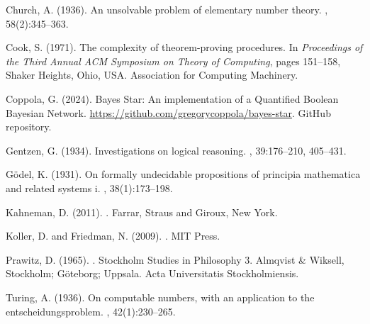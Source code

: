 \documentclass[11pt]{article}
\begin{document}
\begin{thebibliography}{9}

    Church, A. (1936).
    \newblock An unsolvable problem of elementary number theory.
    , 58(2):345--363.
    
    Cook, S. (1971).
    \newblock The complexity of theorem-proving procedures.
    \newblock In {\em Proceedings of the Third Annual ACM Symposium on Theory of
      Computing}, pages 151--158, Shaker Heights, Ohio, USA. Association for
      Computing Machinery.
    
    Coppola, G. (2024).
    \newblock Bayes {S}tar: An implementation of a {Q}uantified {B}oolean
      {B}ayesian {N}etwork.
    \newblock \url{https://github.com/gregorycoppola/bayes-star}.
    \newblock GitHub repository.
    
    Gentzen, G. (1934).
    \newblock Investigations on logical reasoning.
    , 39:176--210, 405--431.
    
    Gödel, K. (1931).
    \newblock On formally undecidable propositions of principia mathematica and
      related systems i.
    , 38(1):173--198.
    
    Kahneman, D. (2011).
    .
    \newblock Farrar, Straus and Giroux, New York.
    
    Koller, D. and Friedman, N. (2009).
    .
    \newblock MIT Press.
    
    Prawitz, D. (1965).
    .
    \newblock Stockholm Studies in Philosophy 3. Almqvist \& Wiksell, Stockholm;
      Göteborg; Uppsala.
    \newblock Acta Universitatis Stockholmiensis.
    
    Turing, A. (1936).
    \newblock On computable numbers, with an application to the
      entscheidungsproblem.
    , 42(1):230--265.
    
    \end{thebibliography}
    
\end{document}
